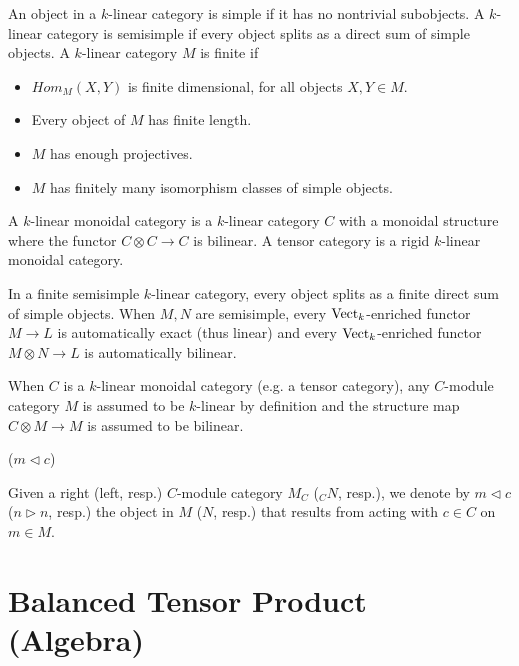 \begin{definition} \cite{egno/tensor-cats}
  An object in a $k$-linear category is simple if it has no nontrivial
  subobjects. A $k$-linear category is semisimple if every object splits as a
  direct sum of simple objects. A $k$-linear category $M$ is finite if

  \begin{itemize}
    \item $Hom_M(X,Y)$ is finite dimensional, for all objects $X,Y\in M$.
    \item Every object of $M$ has finite length.
    \item $M$ has enough projectives.
    \item $M$ has finitely many isomorphism classes of simple objects.
  \end{itemize}
  A $k$-linear monoidal category is a $k$-linear category $C$ with a monoidal
  structure where the functor $C\otimes C\to C$ is bilinear. A tensor category
  is a rigid $k$-linear monoidal category.
\end{definition}

\noindent In a finite semisimple $k$-linear category, every object splits as a
finite direct sum of simple objects. When $M,N$ are semisimple, every
$\operatorname{Vect}_{k}$-enriched functor $M\to L$ is automatically exact (thus linear) and
every $\operatorname{Vect}_{k}$-enriched functor $M\otimes N\to L$ is automatically
bilinear.

\begin{assumption}
When $C$ is a $k$-linear monoidal category (e.g. a tensor category), any
$C$-module category $M$ is assumed to be $k$-linear by definition and the
structure map $C\otimes M\to M$ is assumed to be bilinear.
\end{assumption}

\begin{notation} ($m \lhd c$)

Given a right (left, resp.) $C$-module category $M_C$ ($_{C}N$, resp.), we
denote by $m\lhd c$ ($n \rhd n$, resp.) the object in $M$ ($N$, resp.) that
results from acting with $c\in C$ on $m\in M$.

\end{notation}


\section{Balanced Tensor Product (Algebra)}\label{section/balanced-tensor-product}

